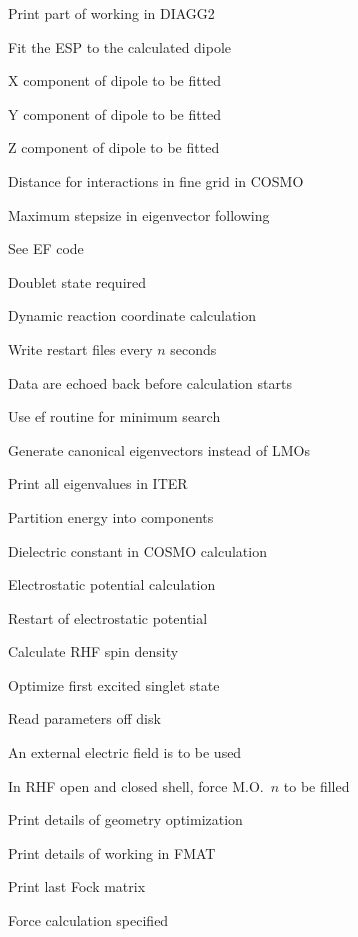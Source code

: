 \begin{description}
\item[] Print part of working in DIAGG2
\item[] Fit the ESP to the calculated dipole
\item[] X component of dipole to be fitted
\item[] Y component of dipole to be fitted
\item[] Z component of dipole to be fitted
\item[] Distance for interactions in fine grid in COSMO
\item[] Maximum stepsize in eigenvector following
\item[] See EF code
\item[] Doublet state required
\item[] Dynamic reaction coordinate calculation
\item[] Write restart files every $n$ seconds
\item[] Data are echoed back before calculation starts
\item[] Use ef routine for minimum search
\item[] Generate canonical eigenvectors instead of LMOs
\item[] Print all eigenvalues in ITER
\item[] Partition energy into components
\item[] Dielectric constant in COSMO calculation
\item[] Electrostatic potential calculation
\item[] Restart of electrostatic potential
\item[] Calculate RHF spin density
\item[] Optimize first excited singlet state
\item[] Read parameters off disk
\item[] An external electric field is to be used
\item[] In RHF open and closed shell, force M.O.\ $n$  to be filled
\item[] Print details of geometry optimization
\item[] Print details of working in FMAT
\item[] Print last Fock matrix
\item[] Force calculation specified

\end{description}
